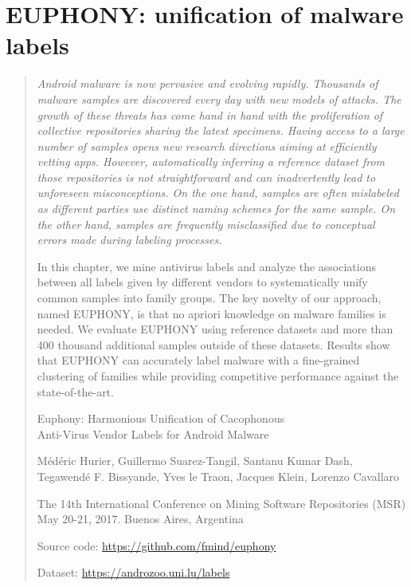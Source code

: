 \chapter{EUPHONY: unification of malware labels}
\label{chapter:euphony}

\begin{quote}
{\itshape
Android malware is now pervasive and evolving rapidly. Thousands of malware samples are discovered every day with new models of attacks. The growth of these threats has come hand in hand with the proliferation of collective repositories sharing the latest specimens. Having access to a large number of samples opens new research directions aiming at efficiently vetting apps. However, automatically inferring a reference dataset from those repositories is not straightforward and can inadvertently lead to unforeseen misconceptions. On the one hand, samples are often mislabeled as different parties use distinct naming schemes for the same sample. On the other hand, samples are frequently misclassified due to conceptual errors made during labeling processes.
    
In this chapter, we mine antivirus labels and analyze the associations between all labels given by different vendors to systematically unify common samples into family groups. The key novelty of our approach, named EUPHONY, is that no apriori knowledge on malware families is needed. We evaluate EUPHONY using reference datasets and more than 400 thousand additional samples outside of these datasets. Results show that EUPHONY can accurately label malware with a fine-grained clustering of families while providing competitive performance against the state-of-the-art.

\vfill

\begin{center}
Euphony: Harmonious Unification of Cacophonous \\ Anti-Virus Vendor Labels for Android Malware

Médéric Hurier, Guillermo Suarez-Tangil, Santanu Kumar Dash, \\ Tegawendé F. Bissyande, Yves le Traon, Jacques Klein, Lorenzo Cavallaro

The 14th International Conference on Mining Software Repositories (MSR) \\
May 20-21, 2017. Buenos Aires, Argentina

Source code: \url{https://github.com/fmind/euphony}

Dataset: \url{https://androzoo.uni.lu/labels}
\end{center}
}
\end{quote}


